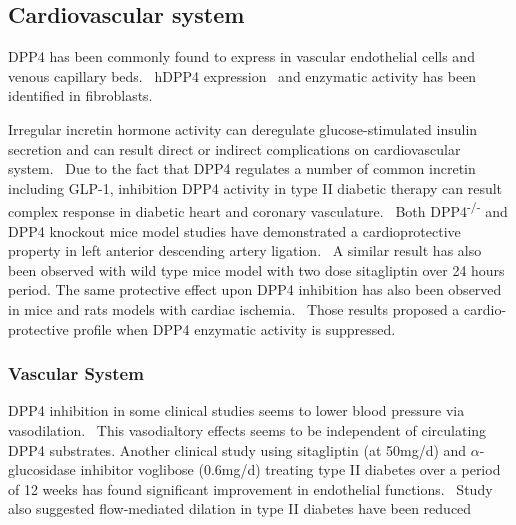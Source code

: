 \subsection{Cardiovascular system}
DPP4 has been commonly found to express in vascular endothelial cells and venous capillary beds.~\cite{Matheeussen2013,Shigeta2012} hDPP4 expression~\cite{Nemoto1999} and enzymatic activity has been identified in fibroblasts.~\cite{Ospelt2010}
\par 
Irregular incretin hormone activity can deregulate glucose-stimulated insulin secretion and can result direct or indirect complications on cardiovascular system.~\cite{Ussher2012} Due to the fact that DPP4 regulates a number of common incretin including GLP-1, inhibition DPP4 activity in type II diabetic therapy can result complex response in diabetic heart and coronary vasculature.~\cite{Ussher2014} Both DPP4\textsuperscript{-/-} and DPP4 knockout mice model studies have demonstrated a cardioprotective property in left anterior descending artery ligation.~\cite{Sauvé2010} A similar result has also been observed with wild type mice model with two dose sitagliptin over 24 hours period. The same protective effect upon DPP4 inhibition has also been observed in mice and rats models with cardiac ischemia.~\cite{Ussher2012} Those results proposed a cardio-protective profile when DPP4 enzymatic activity is suppressed. 
\par 

\subsubsection{Vascular System}
DPP4 inhibition in some clinical studies seems to lower blood pressure via vasodilation.~\cite{Kröller-Schön2012} This vasodialtory effects seems to be independent of circulating DPP4 substrates. Another clinical study using sitagliptin (at 50mg/d) and $\alpha$-glucosidase inhibitor voglibose (0.6mg/d) treating type II diabetes over a period of 12 weeks has found significant improvement in endothelial functions.~\cite{Nakamura2014} Study also suggested flow-mediated dilation in type II diabetes have been reduced 
